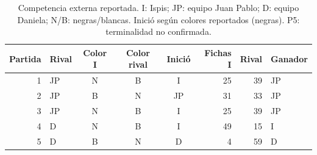 \begin{table}[htbp]
\centering\small
\caption{Competencia externa reportada. I: Ispis; JP: equipo Juan Pablo; D: equipo Daniela; N/B: negras/blancas. Inició según colores reportados (negras). P5: terminalidad no confirmada.}
\label{tab:othello_externa}
\begin{tabular}{rlcccrrl}
\toprule
Partida & Rival & Color I & Color rival & Inició & Fichas I & Rival & Ganador \\
\midrule
1 & JP & N & B & I & 25 & 39 & JP \\
2 & JP & B & N & JP & 31 & 33 & JP \\
3 & JP & N & B & I & 25 & 39 & JP \\
4 & D & N & B & I & 49 & 15 & I \\
5 & D & B & N & D & 4 & 59 & D \\
\bottomrule
\end{tabular}
\end{table}
